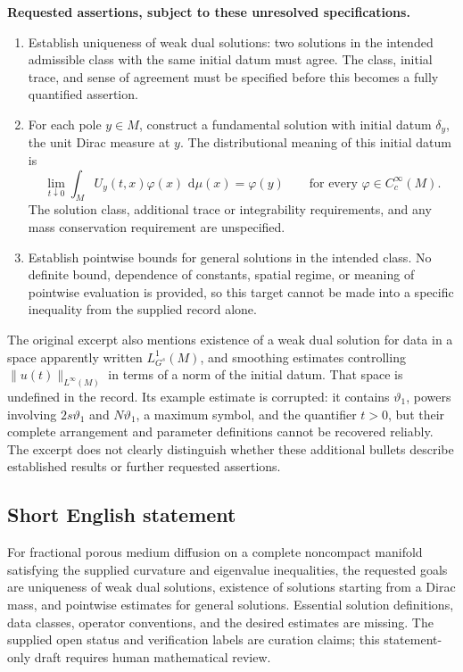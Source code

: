 \documentclass[11pt]{article}
\newcommand{\dd}{\,\mathrm{d}}
\begin{document}
\textbf{Requested assertions, subject to these unresolved specifications.}
\begin{enumerate}
\item Establish uniqueness of weak dual solutions: two solutions in the intended admissible class with the same initial datum must agree. The class, initial trace, and sense of agreement must be specified before this becomes a fully quantified assertion.
\item For each pole \(y\in M\), construct a fundamental solution with initial datum \(\delta_y\), the unit Dirac measure at \(y\). The distributional meaning of this initial datum is
\[
\lim_{t\downarrow0}\int_M U_y(t,x)\varphi(x)\,\dd\mu(x)=\varphi(y)
\qquad\text{for every }\varphi\in C_c^\infty(M).
\]
The solution class, additional trace or integrability requirements, and any mass conservation requirement are unspecified.
\item Establish pointwise bounds for general solutions in the intended class. No definite bound, dependence of constants, spatial regime, or meaning of pointwise evaluation is provided, so this target cannot be made into a specific inequality from the supplied record alone.
\end{enumerate}
The original excerpt also mentions existence of a weak dual solution for data in a space apparently written \(L^1_{G^s}(M)\), and smoothing estimates controlling \(\|u(t)\|_{L^\infty(M)}\) in terms of a norm of the initial datum. That space is undefined in the record. Its example estimate is corrupted: it contains \(\vartheta_1\), powers involving \(2s\vartheta_1\) and \(N\vartheta_1\), a maximum symbol, and the quantifier \(t>0\), but their complete arrangement and parameter definitions cannot be recovered reliably. The excerpt does not clearly distinguish whether these additional bullets describe established results or further requested assertions.
\subsection{Short English statement}
For fractional porous medium diffusion on a complete noncompact manifold satisfying the supplied curvature and eigenvalue inequalities, the requested goals are uniqueness of weak dual solutions, existence of solutions starting from a Dirac mass, and pointwise estimates for general solutions. Essential solution definitions, data classes, operator conventions, and the desired estimates are missing. The supplied open status and verification labels are curation claims; this statement-only draft requires human mathematical review.
\end{document}
